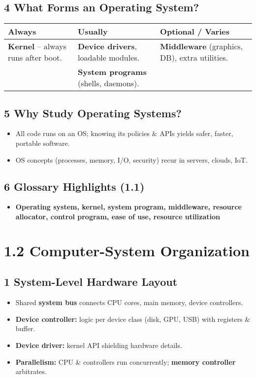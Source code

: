 \documentclass{article}
\begin{document}
\subsection*{4 What Forms an Operating System?}
\centering
\begin{tabular}{>{\RaggedRight}p{} >{\RaggedRight}p{} >{\RaggedRight\arraybackslash}p{}}
\toprule
\textbf{Always} & \textbf{Usually} & \textbf{Optional / Varies} \\
\midrule
\textbf{Kernel} – always runs after boot. & \textbf{Device drivers}, loadable modules. & \textbf{Middleware} (graphics, DB), extra utilities. \\
& \textbf{System programs} (shells, daemons). & \\
\bottomrule
\end{tabular}
\vspace{\baselineskip} %

\subsection*{5 Why Study Operating Systems?}
\begin{itemize}
    \item All code runs on an OS; knowing its policies \& APIs yields safer, faster, portable software.
    \item OS concepts (processes, memory, I/O, security) recur in servers, clouds, IoT.
\end{itemize}

\subsection*{6 Glossary Highlights (1.1)}
\begin{itemize}
    \item \textbf{Operating system, kernel, system program, middleware, resource allocator, control program, ease of use, resource utilization}
\end{itemize}

\section*{1.2 Computer-System Organization}
\subsection*{1 System-Level Hardware Layout}
\begin{itemize}
    \item Shared \textbf{system bus} connects CPU cores, main memory, device controllers.
    \item \textbf{Device controller:} logic per device class (disk, GPU, USB) with registers \& buffer.
    \item \textbf{Device driver:} kernel API shielding hardware details.
    \item \textbf{Parallelism:} CPU \& controllers run concurrently; \textbf{memory controller} arbitrates.
\end{itemize}
\end{document}
